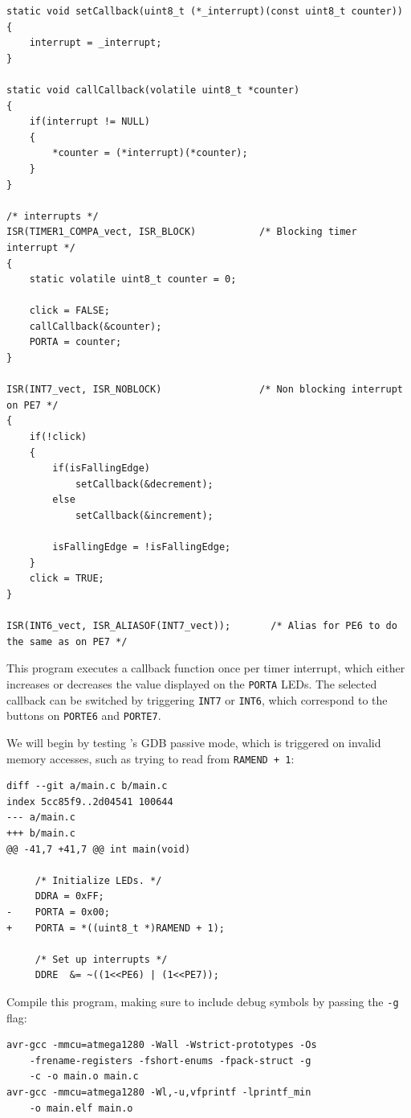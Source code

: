 \begin{lstlisting}
static void setCallback(uint8_t (*_interrupt)(const uint8_t counter))
{
    interrupt = _interrupt;
}

static void callCallback(volatile uint8_t *counter)
{
    if(interrupt != NULL)
    {
        *counter = (*interrupt)(*counter);
    }
}

/* interrupts */
ISR(TIMER1_COMPA_vect, ISR_BLOCK)           /* Blocking timer interrupt */
{
    static volatile uint8_t counter = 0;

    click = FALSE;
    callCallback(&counter);
    PORTA = counter;
}

ISR(INT7_vect, ISR_NOBLOCK)                 /* Non blocking interrupt on PE7 */
{
    if(!click)
    {
        if(isFallingEdge)
            setCallback(&decrement);
        else
            setCallback(&increment);

        isFallingEdge = !isFallingEdge;
    }
    click = TRUE;
}

ISR(INT6_vect, ISR_ALIASOF(INT7_vect));       /* Alias for PE6 to do the same as on PE7 */
\end{lstlisting}

This program executes a callback function once per timer interrupt, which either
increases or decreases the value displayed on the \verb|PORTA| \acp{LED}. The selected callback
can be switched by triggering \lstinline|INT7| or \lstinline|INT6|, which correspond
to the buttons on \verb|PORTE6| and \verb|PORTE7|.

We will begin by testing \simavr's \ac{GDB} passive mode, which is triggered on
invalid memory accesses, such as trying to read from \lstinline|RAMEND + 1|:

\begin{lstlisting}
diff --git a/main.c b/main.c
index 5cc85f9..2d04541 100644
--- a/main.c
+++ b/main.c
@@ -41,7 +41,7 @@ int main(void)

     /* Initialize LEDs. */
     DDRA = 0xFF;
-    PORTA = 0x00;
+    PORTA = *((uint8_t *)RAMEND + 1);

     /* Set up interrupts */
     DDRE  &= ~((1<<PE6) | (1<<PE7));
\end{lstlisting}

Compile this program, making sure to include debug symbols by passing the \verb|-g|
flag:

\begin{verbatim}
avr-gcc -mmcu=atmega1280 -Wall -Wstrict-prototypes -Os
    -frename-registers -fshort-enums -fpack-struct -g
    -c -o main.o main.c
avr-gcc -mmcu=atmega1280 -Wl,-u,vfprintf -lprintf_min
    -o main.elf main.o
\end{verbatim}

